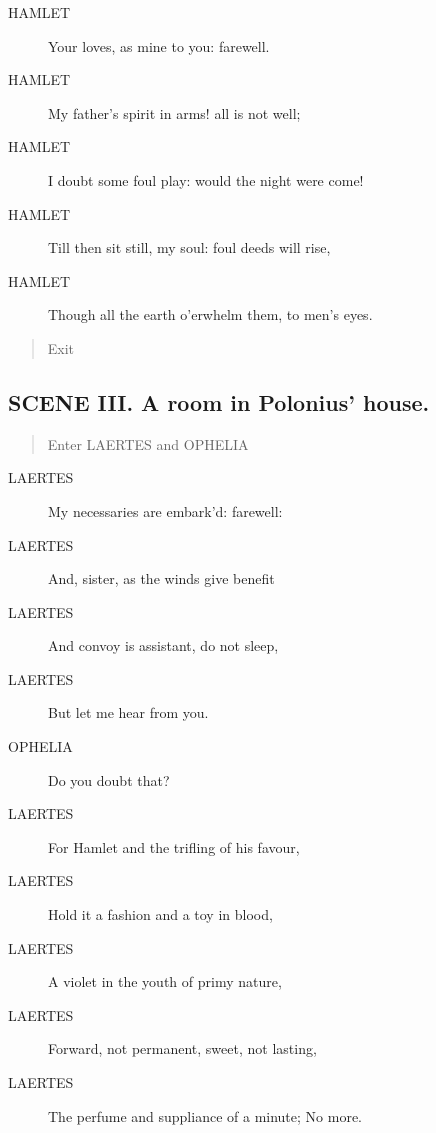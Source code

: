 \documentclass{article}
\begin{document}
\begin{description}
            
\item[HAMLET] Your loves, as mine to you: farewell.
\item[HAMLET] My father's spirit in arms! all is not well;
\item[HAMLET] I doubt some foul play: would the night were come!
\item[HAMLET] Till then sit still, my soul: foul deeds will rise,
\item[HAMLET] Though all the earth o'erwhelm them, to men's eyes.
\end{description}
          
\begin{quote}
Exit
\end{quote}
          
\subsection{SCENE III.  A room in Polonius' house.}
          
\begin{quote}
Enter LAERTES and OPHELIA
\end{quote}
          
\begin{description}
            
\item[LAERTES] My necessaries are embark'd: farewell:
\item[LAERTES] And, sister, as the winds give benefit
\item[LAERTES] And convoy is assistant, do not sleep,
\item[LAERTES] But let me hear from you.
\end{description}
          
\begin{description}
            
\item[OPHELIA] Do you doubt that?
\end{description}
          
\begin{description}
            
\item[LAERTES] For Hamlet and the trifling of his favour,
\item[LAERTES] Hold it a fashion and a toy in blood,
\item[LAERTES] A violet in the youth of primy nature,
\item[LAERTES] Forward, not permanent, sweet, not lasting,
\item[LAERTES] The perfume and suppliance of a minute; No more.
\end{description}
          
\end{document}
